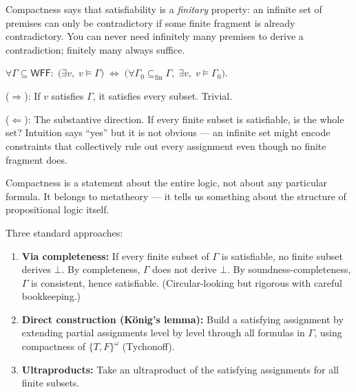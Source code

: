 \begin{remark}
Compactness says that satisfiability is a \emph{finitary} property: an infinite
set of premises can only be contradictory if some finite fragment is already
contradictory. You can never need infinitely many premises to derive a
contradiction; finitely many always suffice.
\end{remark}

\begin{remark}
$\forall \Gamma \subseteq \mathsf{WFF}:\;
\bigl(\exists v,\; v \models \Gamma\bigr)
\;\Longleftrightarrow\;
\bigl(\forall \Gamma_0 \subseteq_{\mathrm{fin}} \Gamma,\;
\exists v,\; v \models \Gamma_0\bigr)$.
\end{remark}

\begin{remark}
($\Rightarrow$): If $v$ satisfies $\Gamma$, it satisfies every subset. Trivial.

($\Leftarrow$): The substantive direction. If every finite subset is satisfiable,
is the whole set? Intuition says ``yes'' but it is not obvious — an infinite set
might encode constraints that collectively rule out every assignment even though
no finite fragment does.
\end{remark}

\begin{remark}
Compactness is a statement about the entire logic, not about any particular
formula. It belongs to metatheory — it tells us something about the structure
of propositional logic itself.
\end{remark}

\begin{remark}\label{rem:compact-proof}
Three standard approaches:
\begin{enumerate}
  \item \textbf{Via completeness:} If every finite subset of $\Gamma$ is
        satisfiable, no finite subset derives $\bot$. By completeness, $\Gamma$
        does not derive $\bot$. By soundness-completeness, $\Gamma$ is consistent,
        hence satisfiable. (Circular-looking but rigorous with careful bookkeeping.)
  \item \textbf{Direct construction (König's lemma):} Build a satisfying
        assignment by extending partial assignments level by level through all
        formulas in $\Gamma$, using compactness of $\{T,F\}^\omega$ (Tychonoff).
  \item \textbf{Ultraproducts:} Take an ultraproduct of the satisfying assignments
        for all finite subsets.
\end{enumerate}
\end{remark}

